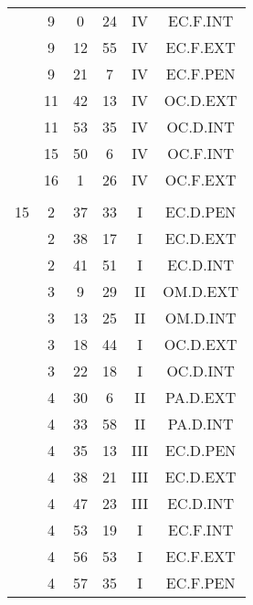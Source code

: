 \documentclass[12pt, a4paper]{article}
\begin{document}
\begin{multicols}{3}
{\begin{tabular}{c c c c c c}
	 	 	 	 & 9 & 0 & 24 & IV & EC.F.INT\\%
	 	 	 	 & 9 & 12 & 55 & IV & EC.F.EXT\\%
	 	 	 	 & 9 & 21 & 7 & IV & EC.F.PEN\\%
	 	 	 	 & 11 & 42 & 13 & IV & OC.D.EXT\\%
	 	 	 	 & 11 & 53 & 35 & IV & OC.D.INT\\%
	 	 	 	 & 15 & 50 & 6 & IV & OC.F.INT\\%
	 	 	 	 & 16 & 1 & 26 & IV & OC.F.EXT\\%
	 	 	 	 & & & & & \\%
	 	 	 	15 & 2 & 37 & 33 & I & EC.D.PEN\\%
	 	 	 	 & 2 & 38 & 17 & I & EC.D.EXT\\%
	 	 	 	 & 2 & 41 & 51 & I & EC.D.INT\\%
	 	 	 	 & 3 & 9 & 29 & II & OM.D.EXT\\%
	 	 	 	 & 3 & 13 & 25 & II & OM.D.INT\\%
	 	 	 	 & 3 & 18 & 44 & I & OC.D.EXT\\%
	 	 	 	 & 3 & 22 & 18 & I & OC.D.INT\\%
	 	 	 	 & 4 & 30 & 6 & II & PA.D.EXT\\%
	 	 	 	 & 4 & 33 & 58 & II & PA.D.INT\\%
	 	 	 	 & 4 & 35 & 13 & III & EC.D.PEN\\%
	 	 	 	 & 4 & 38 & 21 & III & EC.D.EXT\\%
	 	 	 	 & 4 & 47 & 23 & III & EC.D.INT\\%
	 	 	 	 & 4 & 53 & 19 & I & EC.F.INT\\%
	 	 	 	 & 4 & 56 & 53 & I & EC.F.EXT\\%
	 	 	 	 & 4 & 57 & 35 & I & EC.F.PEN\\%

\end{tabular}}
\end{multicols}
\end{document}
